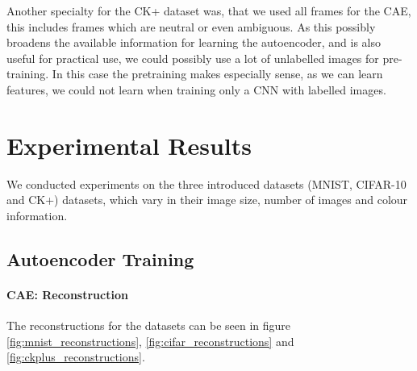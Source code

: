 \documentclass[draft]{article}
\begin{document}
      Another specialty for the CK+ dataset was, that we used all frames for the CAE, this includes frames which are neutral or even ambiguous.
      As this possibly broadens the available information for learning the autoencoder, and is also useful for practical use, we could possibly
      use a lot of unlabelled images for pre-training. In this case the pretraining makes especially sense, as we can learn features,
      we could not learn when training only a CNN with labelled images.


\section{Experimental Results}
  We conducted experiments on the three introduced datasets (MNIST, CIFAR-10 and CK+) datasets, which vary in their image size, number of images and colour information.

  
  \subsection{Autoencoder Training}


    \paragraph{CAE: Reconstruction}
    The reconstructions for the datasets can be seen in figure \ref{fig:mnist_reconstructions}, \ref{fig:cifar_reconstructions} and \ref{fig:ckplus_reconstructions}.

\end{document}
